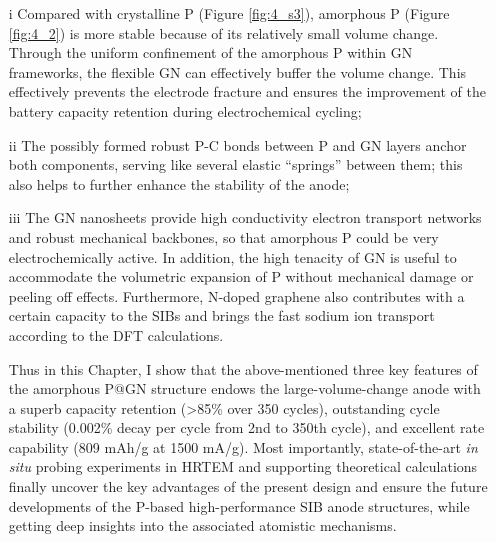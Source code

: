 \begin{itemize}
	\item[i] Compared with crystalline P (Figure \ref{fig:4_s3}), amorphous P (Figure \ref{fig:4_2}) is more stable because of its relatively small volume change.\cite{Qian2013b,Kim2013c} Through the uniform confinement of the amorphous P within GN frameworks, the flexible GN can effectively buffer the volume change. This effectively prevents the electrode fracture and ensures the improvement of the battery capacity retention during electrochemical cycling;\\
    \item[ii] The possibly formed robust P-C bonds between P and GN layers anchor both components, serving like several elastic “springs” between them; this also helps to further enhance the stability of the anode;\\
    \item[iii] The GN nanosheets provide high conductivity electron transport networks and robust mechanical backbones, so that amorphous P could be very electrochemically active. In addition, the high tenacity of GN is useful to accommodate the volumetric expansion of P without mechanical damage or peeling off effects. Furthermore, N-doped graphene also contributes with a certain capacity to the SIBs and brings the fast sodium ion transport according to the DFT calculations.

Thus in this Chapter, I show that the above-mentioned three key features of the amorphous P@GN structure endows the large-volume-change anode with a superb capacity retention (>85\% over 350 cycles), outstanding cycle stability (0.002\% decay per cycle from 2nd to 350th cycle), and excellent rate capability (809 mAh/g at 1500 mA/g). Most importantly, state-of-the-art {\em in situ} probing experiments in HRTEM and supporting theoretical calculations finally uncover the key advantages of the present design and ensure the future developments of the P-based high-performance SIB anode structures, while getting deep insights into the associated atomistic mechanisms. 
\end{itemize}


